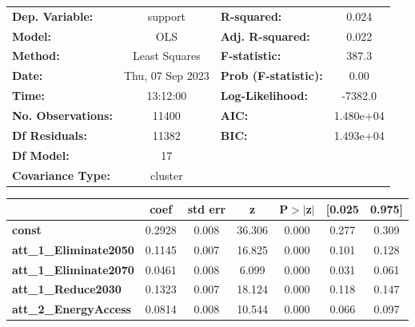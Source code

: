 \begin{center}
\begin{tabular}{lclc}
\toprule
\textbf{Dep. Variable:}              &     support      & \textbf{  R-squared:         } &     0.024   \\
\textbf{Model:}                      &       OLS        & \textbf{  Adj. R-squared:    } &     0.022   \\
\textbf{Method:}                     &  Least Squares   & \textbf{  F-statistic:       } &     387.3   \\
\textbf{Date:}                       & Thu, 07 Sep 2023 & \textbf{  Prob (F-statistic):} &     0.00    \\
\textbf{Time:}                       &     13:12:00     & \textbf{  Log-Likelihood:    } &   -7382.0   \\
\textbf{No. Observations:}           &       11400      & \textbf{  AIC:               } & 1.480e+04   \\
\textbf{Df Residuals:}               &       11382      & \textbf{  BIC:               } & 1.493e+04   \\
\textbf{Df Model:}                   &          17      & \textbf{                     } &             \\
\textbf{Covariance Type:}            &     cluster      & \textbf{                     } &             \\
\bottomrule
\end{tabular}
\begin{tabular}{lcccccc}
                                     & \textbf{coef} & \textbf{std err} & \textbf{z} & \textbf{P$> |$z$|$} & \textbf{[0.025} & \textbf{0.975]}  \\
\midrule
\textbf{const}                       &       0.2928  &        0.008     &    36.306  &         0.000        &        0.277    &        0.309     \\
\textbf{att\_1\_Eliminate2050}       &       0.1145  &        0.007     &    16.825  &         0.000        &        0.101    &        0.128     \\
\textbf{att\_1\_Eliminate2070}       &       0.0461  &        0.008     &     6.099  &         0.000        &        0.031    &        0.061     \\
\textbf{att\_1\_Reduce2030}          &       0.1323  &        0.007     &    18.124  &         0.000        &        0.118    &        0.147     \\
\textbf{att\_2\_EnergyAccess}        &       0.0814  &        0.008     &    10.544  &         0.000        &        0.066    &        0.097     \\

\end{tabular}
\end{center}
